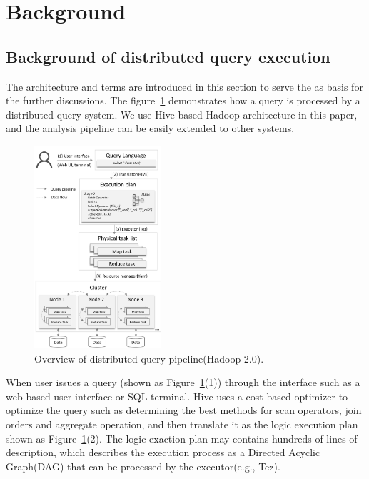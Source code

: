 \section{Background}
\subsection{Background of distributed query execution}
The architecture and terms are introduced in this section to serve the as basis for the further discussions. 
The figure~\ref{fig:architecture} demonstrates how a query is processed by a distributed query system. We use Hive based Hadoop architecture in this paper, and the analysis pipeline can be easily extended to other systems.

\begin{figure}[t]
	\centering
	\includegraphics[width=0.42\textwidth]{figures/background/arc.png}
	\vspace{-3mm}
	\caption{Overview of distributed query pipeline(Hadoop 2.0).}
	\label{fig:architecture}
	\vspace{-3mm}
\end{figure}



When user issues a query (shown as Figure~\ref{fig:architecture}(1)) through the interface such as a web-based user interface or SQL terminal. 
Hive uses a cost-based optimizer to optimize the query such as determining the best methods for scan operators, join orders and aggregate operation, and then translate it as the logic execution plan shown as Figure~\ref{fig:architecture}(2). The logic exaction plan may contains hundreds of lines of description, which describes the execution process as a Directed Acyclic Graph(DAG) that can be processed by the executor(e.g., Tez). 

